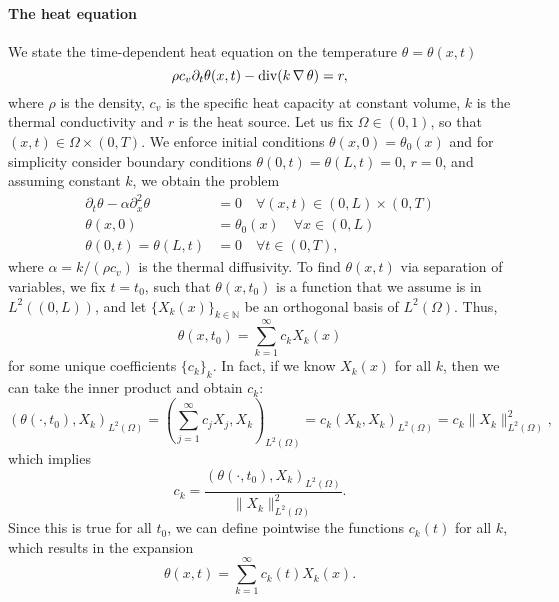 \paragraph{The heat equation} We state the time-dependent heat equation on the temperature $\theta=\theta(x,t)$ 
\begin{equation*}
    \rho c_v \partial_t \theta(x,t) - \operatorname{\text{div}} (k\operatorname{\nabla} \theta) = r,
\end{equation*}
where $\rho$ is the density, $c_v$ is the specific heat capacity at constant volume, $k$ is the thermal conductivity and $r$ is the heat source. Let us fix $\Omega\in(0,1)$, so that $(x,t)\in\Omega\times(0,T)$. We enforce initial conditions $\theta(x,0)=\theta_0(x)$ and for simplicity consider boundary conditions $\theta(0,t) = \theta(L,t) = 0$, $r=0$, and assuming constant $k$, we obtain the problem 
\begin{align*}
    \partial_t \theta - \alpha\partial_x^2\theta &= 0 \quad \forall (x,t)\in(0,L)\times(0,T)\\
    \theta(x,0) &= \theta_0(x) \quad \forall x\in(0,L)\\
    \theta(0,t) = \theta(L,t) &= 0 \quad \forall t\in (0,T),
\end{align*}
where $\alpha = k/(\rho c_v)$ is the thermal diffusivity. To find $\theta(x,t)$ via separation of variables, we fix $t=t_0$, such that $\theta(x,t_0)$ is a function that we assume is in $L^2((0,L))$, and let $\{X_k(x)\}_{k\in\mathbb N}$ be an orthogonal basis of $L^2(\Omega)$. Thus,
\begin{equation*}
    \theta(x,t_0) = \sum_{k=1}^\infty c_kX_k(x)
\end{equation*}
for some unique coefficients $\{c_k\}_k$. In fact, if we know $X_k(x)$ for all $k$, then we can take the inner product and obtain $c_k$:
\begin{equation*}
    (\theta(\cdot, t_0), X_k)_{L^2(\Omega)} = \left(\sum_{j=1}^\infty c_jX_j, X_k\right)_{L^2(\Omega)} = c_k(X_k,X_k)_{L^2(\Omega)} = c_k\|X_k\|_{L^2(\Omega)}^2,
\end{equation*}
which implies 
\begin{equation*}
    c_k = \frac{(\theta(\cdot, t_0), X_k)_{L^2(\Omega)}}{\|X_k\|_{L^2(\Omega)}^2}.
\end{equation*}
Since this is true for all $t_0$, we can define pointwise the functions $c_k(t)$ for all $k$, which results in the expansion 
\begin{equation*}
    \theta(x,t) = \sum_{k=1}^\infty c_k(t)X_k(x).
\end{equation*}
